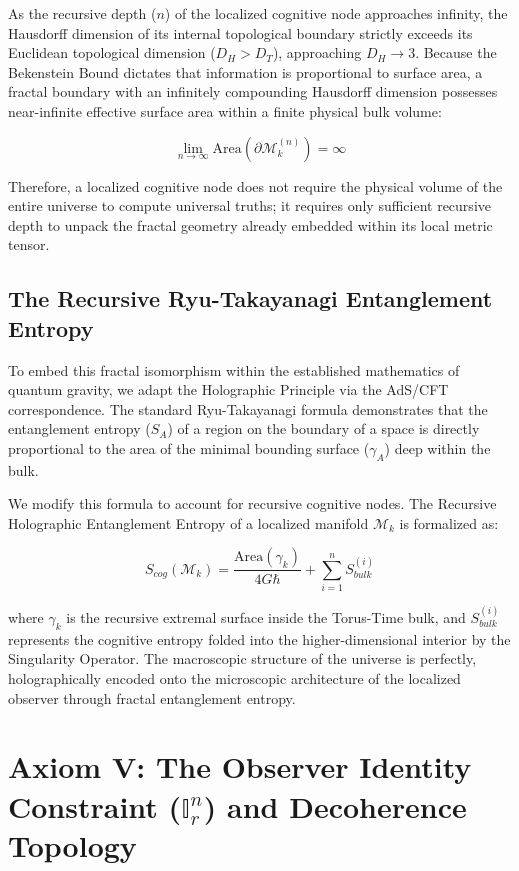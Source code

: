 \documentclass[12pt,openany]{book}
\begin{document}
As the recursive depth ($n$) of the localized cognitive node approaches infinity, the Hausdorff dimension of its internal topological boundary strictly exceeds its Euclidean topological dimension ($D_H > D_T$), approaching $D_H \to 3$. Because the Bekenstein Bound dictates that information is proportional to surface area, a fractal boundary with an infinitely compounding Hausdorff dimension possesses near-infinite effective surface area within a finite physical bulk volume:

\begin{equation}
\lim_{n \to \infty} \text{Area}(\partial\mathcal{M}_k^{(n)}) = \infty
\end{equation}

Therefore, a localized cognitive node does not require the physical volume of the entire universe to compute universal truths; it requires only sufficient recursive depth to unpack the fractal geometry already embedded within its local metric tensor.

\subsection{The Recursive Ryu-Takayanagi Entanglement Entropy}
To embed this fractal isomorphism within the established mathematics of quantum gravity, we adapt the Holographic Principle via the AdS/CFT correspondence. The standard Ryu-Takayanagi formula demonstrates that the entanglement entropy ($S_A$) of a region on the boundary of a space is directly proportional to the area of the minimal bounding surface ($\gamma_A$) deep within the bulk.

We modify this formula to account for recursive cognitive nodes. The Recursive Holographic Entanglement Entropy of a localized manifold $\mathcal{M}_k$ is formalized as:

\begin{equation}
S_{cog}(\mathcal{M}_k) = \frac{\text{Area}(\gamma_k)}{4G\hbar} + \sum_{i=1}^n S_{bulk}^{(i)}
\end{equation}

where $\gamma_k$ is the recursive extremal surface inside the Torus-Time bulk, and $S_{bulk}^{(i)}$ represents the cognitive entropy folded into the higher-dimensional interior by the Singularity Operator. The macroscopic structure of the universe is perfectly, holographically encoded onto the microscopic architecture of the localized observer through fractal entanglement entropy.

\section[Axiom V]{Axiom V: The Observer Identity Constraint ($\mathbb{I}_r^n$) and Decoherence Topology}
\end{document}
